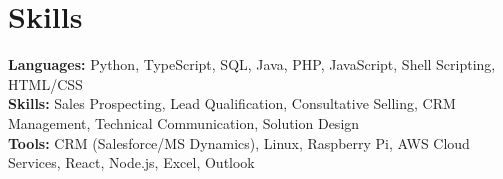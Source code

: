 \documentclass[11pt]{article}       %
\begin{document}

\vspace{-18.5pt}


\section*{Skills}
\textbf{Languages:} Python, TypeScript, SQL, Java, PHP, JavaScript, Shell Scripting, HTML/CSS\\
\textbf{Skills:} Sales Prospecting, Lead Qualification, Consultative Selling, CRM Management, Technical Communication, Solution Design\\
\textbf{Tools:} CRM (Salesforce/MS Dynamics), Linux, Raspberry Pi, AWS Cloud Services, React, Node.js, Excel, Outlook\\

\vspace{-6.5pt}
\end{document}
